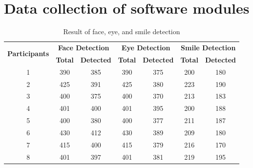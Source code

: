 \section{Data collection of software modules}
\begin{table}[H]
\caption{Result of face, eye, and smile detection}
\label{swM1}
\begin{tabular}{|c|c|c|c|c|c|c|}
\hline
\multirow{2}{*}{\textbf{Participants}} & \multicolumn{2}{c|}{\textbf{Face Detection}} & \multicolumn{2}{c|}{\textbf{Eye Detection}} & \multicolumn{2}{c|}{\textbf{Smile Detection}} \\ \cline{2-7} 
                                       & \textbf{Total}      & \textbf{Detected}      & \textbf{Total}      & \textbf{Detected}     & \textbf{Total}       & \textbf{Detected}      \\ \hline
1                                      & 390                 & 385                    & 390                 & 375                   & 200                  & 180                    \\ \hline
2                                      & 425                 & 391                    & 425                 & 380                   & 223                  & 190                    \\ \hline
3                                      & 400                 & 375                    & 400                 & 370                   & 213                  & 183                    \\ \hline
4                                      & 401                 & 400                    & 401                 & 395                   & 200                  & 188                    \\ \hline
5                                      & 400                 & 380                    & 400                 & 377                   & 211                  & 187                    \\ \hline
6                                      & 430                 & 412                    & 430                 & 389                   & 209                  & 180                    \\ \hline
7                                      & 415                 & 400                    & 415                 & 379                   & 216                  & 170                    \\ \hline
8                                      & 401                 & 397                    & 401                 & 381                   & 219                  & 195                    \\ \hline

\end{tabular}
\end{table}
